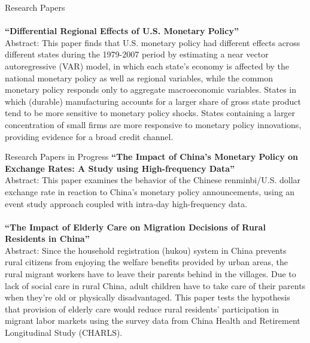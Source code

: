 \documentclass{resume_liang} %
\begin{document}
\begin{rSection}{Research Papers}
\\
\\
\textbf{``Differential Regional Effects of U.S. Monetary Policy''} \\
Abstract: This paper finds that U.S. monetary policy had different effects across different states during the 1979-2007 period by estimating a near vector autoregressive (VAR) model, in which each state's economy is affected by the national monetary policy as well as regional variables, while the common monetary policy responds only to aggregate macroeconomic variables. States in which (durable) manufacturing accounts for a larger share of gross state product tend to be more sensitive to monetary policy shocks. States containing a larger concentration of small firms are more responsive to
monetary policy innovations, providing evidence for a broad credit channel.
\\

\end{rSection}
\bigskip \bigskip




\begin{rSection}{Research Papers in Progress}
\textbf{``The Impact of China's Monetary Policy on Exchange Rates: A Study using High-frequency Data''}\\
Abstract: This paper examines the behavior of the Chinese renminbi/U.S. dollar exchange rate in reaction to China's monetary policy announcements, using an event study approach coupled with intra-day high-frequency data.
\\
\\
\textbf{``The Impact of Elderly Care on Migration Decisions of Rural Residents in China''}
\\
Abstract: Since the household registration (hukou) system in China prevents rural citizens from enjoying the welfare benefits provided by urban areas, the rural migrant workers have to leave their parents behind in the villages. Due to lack of social care in rural China, adult children have to take care of their parents when they’re old or physically disadvantaged. This paper tests the hypothesis that provision of elderly care would reduce rural residents' participation in migrant labor markets using the survey data from China Health and Retirement Longitudinal Study (CHARLS). 
	

\end{rSection}
\bigskip \bigskip
\end{document}
